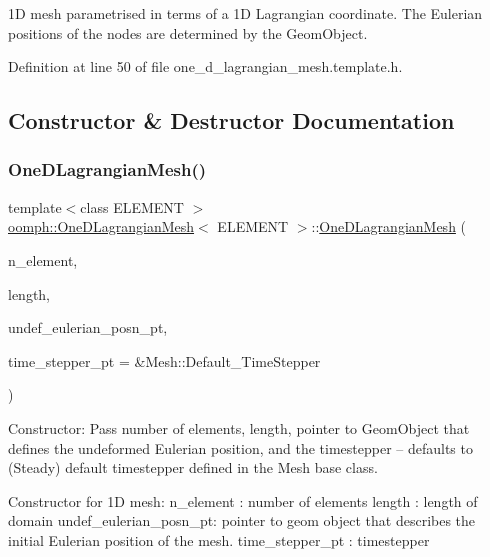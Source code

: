 1D mesh parametrised in terms of a 1D Lagrangian coordinate. The Eulerian positions of the nodes are determined by the Geom\+Object. 

Definition at line 50 of file one\+\_\+d\+\_\+lagrangian\+\_\+mesh.\+template.\+h.



\subsection{Constructor \& Destructor Documentation}
\mbox{\label{classoomph_1_1OneDLagrangianMesh_a7061998be3fb4131c6b58c4943595d49}} 
\subsubsection{\texorpdfstring{One\+D\+Lagrangian\+Mesh()}{OneDLagrangianMesh()}\hspace{0.1cm}{\footnotesize\ttfamily [1/2]}}
{\footnotesize\ttfamily template$<$class E\+L\+E\+M\+E\+NT $>$ \\
\hyperlink{classoomph_1_1OneDLagrangianMesh}{oomph\+::\+One\+D\+Lagrangian\+Mesh}$<$ E\+L\+E\+M\+E\+NT $>$\+::\hyperlink{classoomph_1_1OneDLagrangianMesh}{One\+D\+Lagrangian\+Mesh} (\begin{DoxyParamCaption}\item[{const unsigned \&}]{n\+\_\+element,  }\item[{const double \&}]{length,  }\item[{Geom\+Object $\ast$}]{undef\+\_\+eulerian\+\_\+posn\+\_\+pt,  }\item[{Time\+Stepper $\ast$}]{time\+\_\+stepper\+\_\+pt = {\ttfamily \&Mesh\+:\+:Default\+\_\+TimeStepper} }\end{DoxyParamCaption})}



Constructor\+: Pass number of elements, length, pointer to Geom\+Object that defines the undeformed Eulerian position, and the timestepper -- defaults to (Steady) default timestepper defined in the Mesh base class. 

Constructor for 1D mesh\+: n\+\_\+element \+: number of elements length \+: length of domain undef\+\_\+eulerian\+\_\+posn\+\_\+pt\+: pointer to geom object that describes the initial Eulerian position of the mesh. time\+\_\+stepper\+\_\+pt \+: timestepper 

